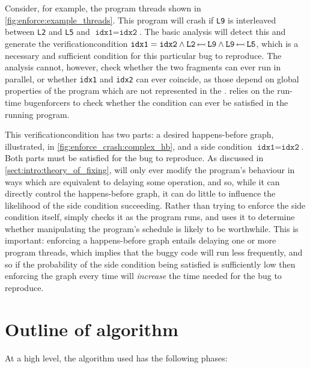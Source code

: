 Consider, for example, the program threads shown in
\autoref{fig:enforce:example_threads}.  This program will crash if
\texttt{L9} is interleaved between \texttt{L2} and \texttt{L5} and
$\texttt{idx1} = \texttt{idx2}$.  The basic analysis will detect this
and generate the \gls{verificationcondition} $\texttt{idx1} =
\texttt{idx2} \wedge \texttt{L2}\,{\leftarrowtail}\,\texttt{L9} \wedge
\texttt{L9}\,{\leftarrowtail}\,\texttt{L5}$, which is a necessary and
sufficient condition for this particular bug to reproduce.  The
analysis cannot, however, check whether the two fragments can ever run
in parallel, or whether \texttt{idx1} and \texttt{idx2} can ever
coincide, as those depend on global properties of the program which
are not represented in the {\StateMachines}.  {\Technique} relies on
the run-time \glspl{bugenforcer} to check whether the condition can
ever be satisfied in the running program.

This \gls{verificationcondition} has two parts: a desired
happens-before graph, illustrated, in
\autoref{fig:enforce_crash:complex_hb}, and a side condition
$\texttt{idx1} = \texttt{idx2}$.  Both parts must be satisfied for the
bug to reproduce.  As discussed in
\autoref{sect:intro:theory_of_fixing}, {\technique} will only ever
modify the program's behaviour in ways which are equivalent to
delaying some operation, and so, while it can directly control the
happens-before graph, it can do little to influence the likelihood of
the side condition succeeding.  Rather than trying to enforce the side
condition itself, {\technique} simply checks it as the program runs,
and uses it to determine whether manipulating the program's schedule
is likely to be worthwhile.  This is important: enforcing a
happens-before graph entails delaying one or more program threads,
which implies that the buggy code will run less frequently, and so if
the probability of the side condition being satisfied is sufficiently
low then enforcing the graph every time will \emph{increase} the time
needed for the bug to reproduce.

\section{Outline of algorithm}

At a high level, the algorithm used has the following phases:

